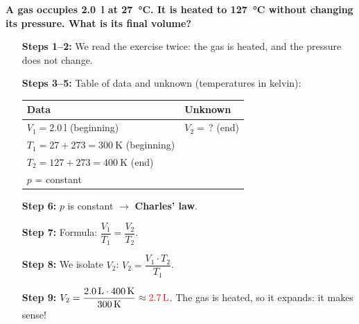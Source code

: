 \begin{example}
    \textbf{A gas occupies \qty{2.0}{\litre} at \qty{27}{\celsius}. It is heated to \qty{127}{\celsius} without changing its pressure. What is its final volume?}
    \begin{itemize}[leftmargin=2.3cm, labelwidth=2cm]
        \item[\textbf{Steps 1--2:}] We read the exercise twice: the gas is heated, and the pressure does not change.
        \item[\textbf{Steps 3--5:}] Table of data and unknown (temperatures in kelvin):
        \begin{center}
            \renewcommand{\arraystretch}{1.3}
            \begin{tabular}{@{}ll@{}}
                \toprule
                \textbf{Data} & \textbf{Unknown} \\
                \midrule
                \(V_1 = \qty{2.0}{\litre}\) (beginning) & \(V_2 = \,?\) (end) \\[3pt]
                \(T_1 = 27 + 273 = \qty{300}{\kelvin}\) (beginning) &  \\[3pt]
                \(T_2 = 127 + 273 = \qty{400}{\kelvin}\) (end) &  \\[3pt]
                \(p\) = constant &  \\
                \bottomrule
            \end{tabular}
        \end{center}
        \item[\textbf{Step 6:}] \(p\) is constant \(\to\) \textbf{Charles' law}.
        \item[\textbf{Step 7:}] Formula: \(\dfrac{V_1}{T_1} = \dfrac{V_2}{T_2}\).
        \item[\textbf{Step 8:}] We isolate \(V_2\): \(V_2 = \dfrac{V_1 \cdot T_2}{T_1}\).
        \item[\textbf{Step 9:}] \(V_2 = \dfrac{\qty{2.0}{\litre} \cdot \qty{400}{\kelvin}}{\qty{300}{\kelvin}} \approx \textcolor{red}{\qty{2.7}{\litre}}\). The gas is heated, so it expands: it makes sense!
    \end{itemize}
\end{example}

